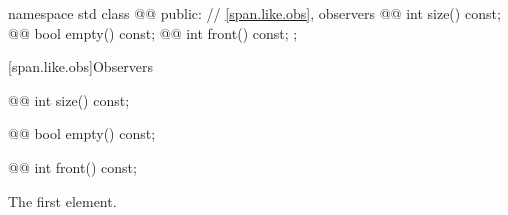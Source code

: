 \begin{codeblock}
namespace std {
  class @@ {
  public:
    // \ref{span.like.obs}, observers
    @@ int size() const;
    @@ bool empty() const;
    @@ int front() const;
  };
}
\end{codeblock}

[span.like.obs]{Observers}

%
\begin{itemdecl}
@@ int size() const;
\end{itemdecl}

\begin{itemdescr}
[\ldots]
\end{itemdescr}

%
\begin{itemdecl}
@@ bool empty() const;
\end{itemdecl}

\begin{itemdescr}
[\ldots]
\end{itemdescr}

%
\begin{itemdecl}
@@ int front() const;
\end{itemdecl}

\begin{itemdescr}
\pnum
\expects
{}

\pnum
\returns
The first element.
\end{itemdescr}
